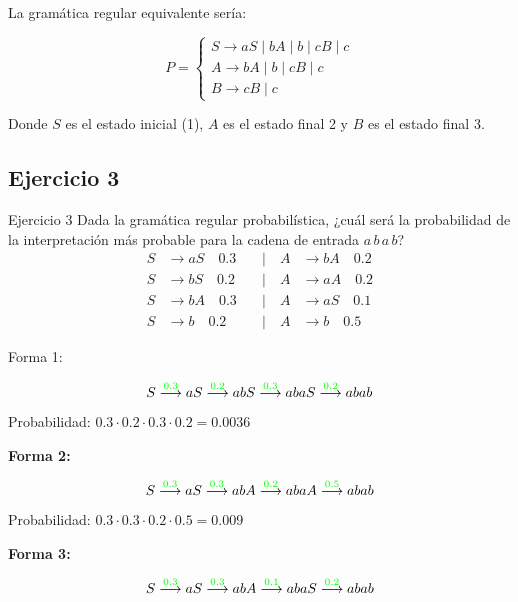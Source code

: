 La gramática regular equivalente sería:


\[
P = 
\begin{cases}
S \to aS \mid bA \mid b \mid cB \mid c \\
A \to bA \mid b \mid cB \mid c \\
B \to cB \mid c
\end{cases}
\]

Donde $S$ es el estado inicial (1), $A$ es el estado final 2 y $B$ es el
estado final 3.

\subsection{Ejercicio 3}

\begin{exercisebox}{Ejercicio 3}
    Dada la gramática regular probabilística, ¿cuál será la probabilidad de la
    interpretación más probable para la cadena de entrada $a \, b \, a \, b$?
    \[
    \begin{aligned}
    S &\rightarrow aS \quad 0.3 \quad &| \quad A &\rightarrow bA \quad 0.2 \\
    S &\rightarrow bS \quad 0.2 \quad &| \quad A &\rightarrow aA \quad 0.2 \\
    S &\rightarrow bA \quad 0.3 \quad &| \quad A &\rightarrow aS \quad 0.1 \\
    S &\rightarrow b \quad 0.2  \quad &| \quad A &\rightarrow b \quad 0.5
    \end{aligned}
    \]
\end{exercisebox}

Forma 1:

\[
S \overset{\textcolor{green}{0.3}}{\longrightarrow} aS 
\overset{\textcolor{green}{0.2}}{\longrightarrow} abS 
\overset{\textcolor{green}{0.3}}{\longrightarrow} abaS 
\overset{\textcolor{green}{0.2}}{\longrightarrow} abab
\]

Probabilidad: $0.3 \cdot 0.2 \cdot 0.3 \cdot 0.2 = 0.0036$

\textbf{Forma 2:}

\[
S \overset{\textcolor{green}{0.3}}{\longrightarrow} aS 
\overset{\textcolor{green}{0.3}}{\longrightarrow} abA 
\overset{\textcolor{green}{0.2}}{\longrightarrow} abaA 
\overset{\textcolor{green}{0.5}}{\longrightarrow} abab
\]

Probabilidad: $0.3 \cdot 0.3 \cdot 0.2 \cdot 0.5 = 0.009$

\textbf{Forma 3:}

\[
S \overset{\textcolor{green}{0.3}}{\longrightarrow} aS 
\overset{\textcolor{green}{0.3}}{\longrightarrow} abA 
\overset{\textcolor{green}{0.1}}{\longrightarrow} abaS 
\overset{\textcolor{green}{0.2}}{\longrightarrow} abab
\]

